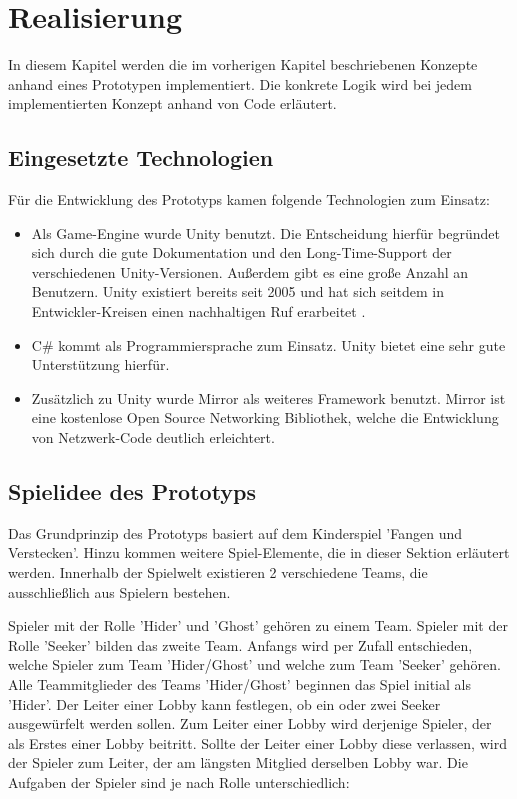 \chapter{Realisierung}
\label{sec:realisierung}

In diesem Kapitel werden die im vorherigen Kapitel beschriebenen Konzepte anhand eines Prototypen implementiert. Die konkrete Logik wird bei jedem implementierten Konzept anhand von Code erläutert.

\section{Eingesetzte Technologien}

Für die Entwicklung des Prototyps kamen folgende Technologien zum Einsatz:

\begin{itemize}
	\item Als Game-Engine wurde Unity \cite{Technologies.03.02.2022} benutzt. Die Entscheidung hierfür begründet sich durch die gute Dokumentation und den Long-Time-Support der verschiedenen Unity-Versionen. Außerdem gibt es eine große Anzahl an Benutzern. Unity existiert bereits seit 2005 und hat sich seitdem in Entwickler-Kreisen einen nachhaltigen Ruf erarbeitet \cite{Wikipedia.2022c}.
	\item C\# kommt als Programmiersprache zum Einsatz. Unity bietet eine sehr gute Unterstützung hierfür.
	\item Zusätzlich zu Unity wurde Mirror\cite{.03.02.2022} als weiteres Framework benutzt. Mirror ist eine kostenlose Open Source Networking Bibliothek, welche die Entwicklung von Netzwerk-Code deutlich erleichtert.
\end{itemize}

\section{Spielidee des Prototyps}
\label{Spielidee}

Das Grundprinzip des Prototyps basiert auf dem Kinderspiel 'Fangen und Verstecken'. Hinzu kommen weitere Spiel-Elemente, die in dieser Sektion erläutert werden. Innerhalb der Spielwelt existieren 2 verschiedene Teams, die ausschließlich aus Spielern bestehen.

Spieler mit der Rolle 'Hider' und 'Ghost' gehören zu einem Team.  Spieler mit der Rolle 'Seeker' bilden das zweite Team. Anfangs wird per Zufall entschieden, welche Spieler zum Team 'Hider/Ghost' und welche zum Team 'Seeker' gehören. Alle Teammitglieder des Teams 'Hider/Ghost' beginnen das Spiel initial als 'Hider'. Der Leiter einer Lobby kann festlegen, ob ein oder zwei Seeker ausgewürfelt werden sollen. Zum Leiter einer Lobby wird derjenige Spieler, der als Erstes einer Lobby beitritt. Sollte der Leiter einer Lobby diese verlassen, wird der Spieler zum Leiter, der am längsten Mitglied derselben Lobby war. Die Aufgaben der Spieler sind je nach Rolle unterschiedlich:

